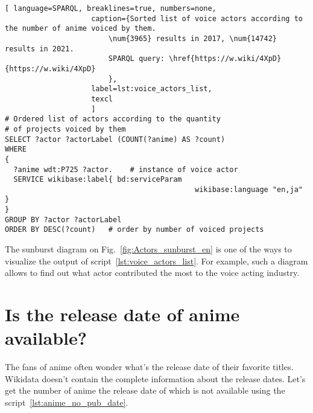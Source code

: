 \begin{lstlisting}[ language=SPARQL, breaklines=true, numbers=none,
                    caption={Sorted list of voice actors according to the number of anime voiced by them.
                        \num{3965} results in 2017, \num{14742} results in 2021.
                        SPARQL query: \href{https://w.wiki/4XpD}{https://w.wiki/4XpD}
                        },
                    label=lst:voice_actors_list,
                    texcl 
                    ]
# Ordered list of actors according to the quantity
# of projects voiced by them
SELECT ?actor ?actorLabel (COUNT(?anime) AS ?count)
WHERE
{
  ?anime wdt:P725 ?actor.	 # instance of voice actor
  SERVICE wikibase:label{ bd:serviceParam
			  								wikibase:language "en,ja" }
}
GROUP BY ?actor	?actorLabel
ORDER BY DESC(?count)	# order by number of voiced projects
\end{lstlisting}%

\begin{figure*}

    \setlength{\fboxsep}{0pt}%
    \setlength{\fboxrule}{1pt}%
	\caption[Sunburst diagram of number of roles voiced by different actors, 2021.]{Sunburst diagram of number of roles voiced by different actors, 2021. The diagram is constructed using the output of script~\ref{lst:voice_actors_list} anf \href{https:\\app.rawgraphs.io}{Rawgraphs} service.}%
    \label{fig:Actors_sunburst_en}%
\end{figure*}

The sunburst diagram on Fig.~\ref{fig:Actors_sunburst_en} is one of the ways to visualize the output of script~\ref{lst:voice_actors_list}. For example, such a diagram allows to find out what actor contributed the most to the voice acting industry.

\section{Is the release date of anime available?}

The fans of anime often wonder what's the release date of their favorite titles. Wikidata doesn't contain the complete information about the release dates. Let's get the number of anime the release date of which is not available using the script~\ref{lst:anime_no_pub_date}.

